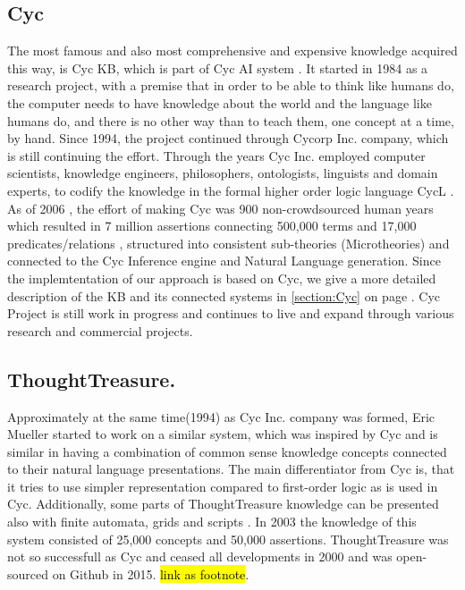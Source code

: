 \subsection{Cyc} The most famous and also most comprehensive and expensive 
knowledge acquired this way, is Cyc KB, which is part of Cyc AI system 
\parencite{Lenat1995}. It started in 1984 as a research project, with a premise 
that in order to be able to think like humans do, the computer needs to have 
knowledge about the world and the language like humans do, and there is no other
way than to teach them, one concept at a time, by hand. Since 1994, the project 
continued through Cycorp Inc. company, which is still continuing the effort. 
Through the years Cyc Inc. employed computer scientists, knowledge engineers, 
philosophers, ontologists, linguists and domain experts, to codify the knowledge
in the formal higher order logic language CycL \parencite{Matuszek2006a}. As of 2006
\parencite{Matuszek2006}, the effort of making Cyc was 900 non-crowdsourced 
human years which resulted in 7 million assertions connecting 500,000 terms and 
17,000 predicates/relations \parencite{Zang2013}, structured into consistent 
sub-theories (Microtheories) and connected to the Cyc Inference engine and 
Natural Language generation. Since the implemtentation of our approach is based
on Cyc, we give a more detailed description of the KB and its connected systems
in \autoref{section:Cyc} on page \pageref{section:Cyc}. Cyc Project is still 
work in progress and continues to live and expand through various research and
commercial projects.

\subsection{ThoughtTreasure.} Approximately at the same time(1994) as Cyc Inc. company
was formed, Eric Mueller started to work on a similar system, which was inspired
by Cyc and is similar in having a combination of common sense knowledge concepts
connected to their natural language presentations. The main differentiator from 
Cyc is, that it tries to use simpler representation compared to first-order 
logic as is used in Cyc. Additionally, some parts of ThoughtTreasure knowledge 
can be presented also with finite automata, grids and scripts 
\parencite{Mueller1999,Mueller2003}. In 2003 the knowledge of this system 
consisted of 25,000 concepts and 50,000 assertions. ThoughtTreasure was not so 
successfull as Cyc and ceased all developments in 2000 and was open-sourced on 
Github in 2015. \hl{link as footnote}.

